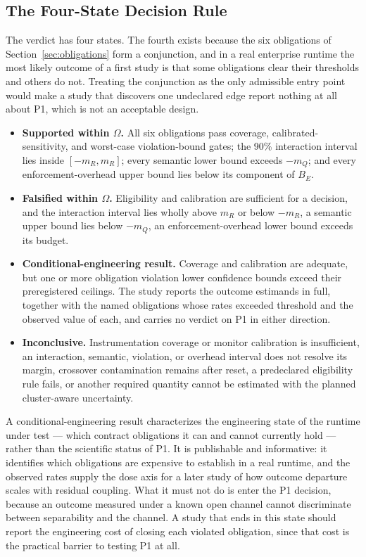 \subsection{The Four-State Decision Rule}
\label{sec:decision-rule}

The verdict has four states. The fourth exists because the six obligations of Section~\ref{sec:obligations} form a conjunction, and in a real enterprise runtime the most likely outcome of a first study is that some obligations clear their thresholds and others do not. Treating the conjunction as the only admissible entry point would make a study that discovers one undeclared edge report nothing at all about P1, which is not an acceptable design.

\begin{itemize}
\item \textbf{Supported within $\Omega$.} All six obligations pass coverage, calibrated-sensitivity, and worst-case violation-bound gates; the 90\% interaction interval lies inside $[-m_R,m_R]$; every semantic lower bound exceeds $-m_Q$; and every enforcement-overhead upper bound lies below its component of $B_E$.
\item \textbf{Falsified within $\Omega$.} Eligibility and calibration are sufficient for a decision, and the interaction interval lies wholly above $m_R$ or below $-m_R$, a semantic upper bound lies below $-m_Q$, an enforcement-overhead lower bound exceeds its budget.
\item \textbf{Conditional-engineering result.} Coverage and calibration are adequate, but one or more obligation violation lower confidence bounds exceed their preregistered ceilings. The study reports the outcome estimands in full, together with the named obligations whose rates exceeded threshold and the observed value of each, and carries no verdict on P1 in either direction.
\item \textbf{Inconclusive.} Instrumentation coverage or monitor calibration is insufficient, an interaction, semantic, violation, or overhead interval does not resolve its margin, crossover contamination remains after reset, a predeclared eligibility rule fails, or another required quantity cannot be estimated with the planned cluster-aware uncertainty.
\end{itemize}

A conditional-engineering result characterizes the engineering state of the runtime under test --- which contract obligations it can and cannot currently hold --- rather than the scientific status of P1. It is publishable and informative: it identifies which obligations are expensive to establish in a real runtime, and the observed rates supply the dose axis for a later study of how outcome departure scales with residual coupling. What it must not do is enter the P1 decision, because an outcome measured under a known open channel cannot discriminate between separability and the channel. A study that ends in this state should report the engineering cost of closing each violated obligation, since that cost is the practical barrier to testing P1 at all.

